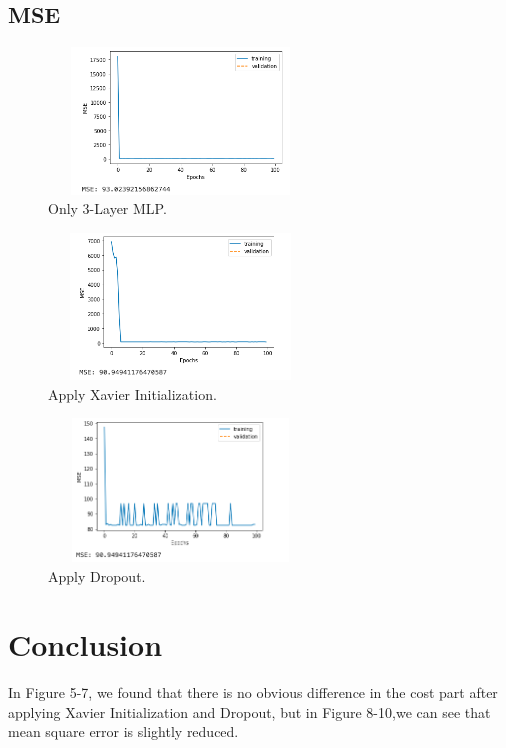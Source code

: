 \documentclass[conference]{IEEEtran}
\begin{document}
\subsection{MSE}
\begin{figure}[htbp]
\centerline{\includegraphics[width=7cm, height=3.9cm]{mse.png}}
\caption{Only 3-Layer MLP.}
\label{mse}
\end{figure}
\begin{figure}[htbp]
\centerline{\includegraphics[width=7cm, height=3.9cm]{mse_xav.png}}
\caption{Apply Xavier Initialization.}
\label{mse_xav}
\end{figure}
\begin{figure}[htbp]
\centerline{\includegraphics[width=7cm, height=3.8cm]{mse_dropout.png}}
\caption{Apply Dropout.}
\label{mse_dropout}
\end{figure}

\section{Conclusion}
In Figure 5-7, we found that there is no obvious difference in the cost part after applying Xavier Initialization and Dropout, but in Figure 8-10,we can see that mean square error is slightly reduced.
\end{document}
